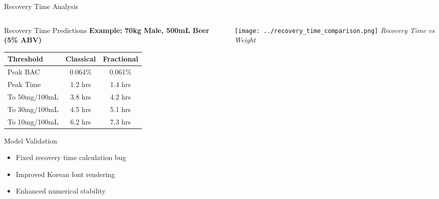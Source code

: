 \documentclass[aspectratio=169]{beamer}
\begin{document}
\begin{frame}{Recovery Time Analysis}
    \begin{columns}
        \begin{column}{0.6\textwidth}
            \begin{block}{Recovery Time Predictions}
                \textbf{Example: 70kg Male, 500mL Beer (5\% ABV)}
                
                \begin{tabular}{lcc}
                    \toprule
                    Threshold & Classical & Fractional \\
                    \midrule
                    Peak BAC & 0.064\% & 0.061\% \\
                    Peak Time & 1.2 hrs & 1.4 hrs \\
                    To 50mg/100mL & 3.8 hrs & 4.2 hrs \\
                    To 30mg/100mL & 4.5 hrs & 5.1 hrs \\
                    To 10mg/100mL & 6.2 hrs & 7.3 hrs \\
                    \bottomrule                \end{tabular}
            \end{block}
            
            \begin{block}{Model Validation}
                \begin{itemize}
                    \item Fixed recovery time calculation bug
                    \item Improved Korean font rendering
                    \item Enhanced numerical stability
                \end{itemize}
            \end{block}
        \end{column}
        
        \begin{column}{0.4\textwidth}
            \begin{center}
                \texttt{[image: ../recovery\_time\_comparison.png]}
                \small{\textit{Recovery Time vs Weight}}
            \end{center}
        \end{column}
    \end{columns}
\end{frame}
\end{document}
